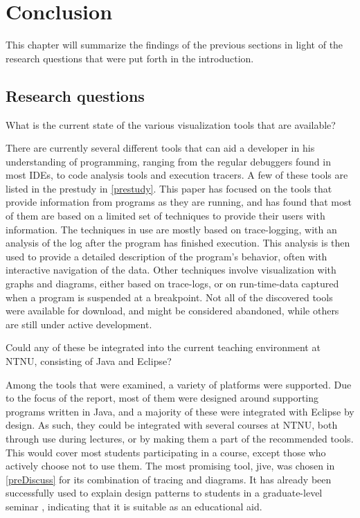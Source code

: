 \chapter{Conclusion}\label{conclusion}

This chapter will summarize the findings of the previous sections in light of the research questions that were put forth in the introduction.

\section{Research questions}\label{conclusionRQs}

\begin{theorem}
What is the current state of the various visualization tools that are available?
\end{theorem}
There are currently several different tools that can aid a developer in his understanding of programming, ranging from the regular debuggers found in most IDEs, to code analysis tools and execution tracers.
A few of these tools are listed in the prestudy in \cref{prestudy}.
This paper has focused on the tools that provide information from programs as they are running, and has found that most of them are based on a limited set of techniques to provide their users with information.
The techniques in use are mostly based on trace-logging, with an analysis of the log after the program has finished execution.
This analysis is then used to provide a detailed description of the program's behavior, often with interactive navigation of the data.
Other techniques involve visualization with graphs and diagrams, either based on trace-logs, or on run-time-data captured when a program is suspended at a breakpoint.
Not all of the discovered tools were available for download, and might be considered abandoned, while others are still under active development.

\begin{theorem}
Could any of these be integrated into the current teaching environment at NTNU, consisting of Java and Eclipse?
\end{theorem}
Among the tools that were examined, a variety of platforms were supported.
Due to the focus of the report, most of them were designed around supporting programs written in Java, and a majority of these were integrated with Eclipse by design.
As such, they could be integrated with several courses at NTNU, both through use during lectures, or by making them a part of the recommended tools.
This would cover most students participating in a course, except those who actively choose not to use them.
The most promising tool, \gls{jive}, was chosen in \cref{preDiscuss} for its combination of tracing and diagrams.
It has already been successfully used to explain design patterns to students in a graduate-level seminar \cite[p. 99]{Gestwicki2005}, indicating that it is suitable as an educational aid.

